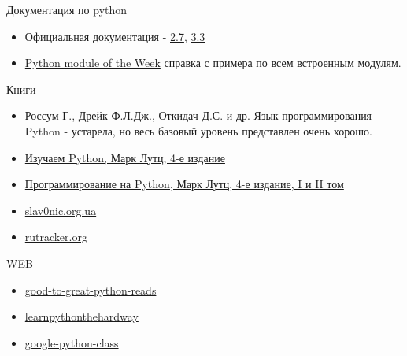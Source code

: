 \documentclass{article}
\begin{document}
\LARGE

\begin{center} Документация по python \end{center}
\begin{itemize}
	\item Официальная документация - \href{http://docs.python.org/2.7/}{2.7}, 
			\href{http://docs.python.org/3.3/}{3.3}
	\item \href{http://www.doughellmann.com/PyMOTW/}{Python module of the Week} 
		  справка с примера по всем встроенным модулям.
\end{itemize}

\begin{center} Книги \end{center}
\begin{itemize}
	\item Россум Г., Дрейк Ф.Л.Дж., Откидач Д.С. и др. Язык программирования Python 
	    - устарела, но весь базовый уровень представлен очень хорошо.
	\item \href{http://rutracker.org/forum/viewtopic.php?t=4130425}{Изучаем Python, Марк Лутц, 4-е издание}
	\item \href{http://rutracker.org/forum/viewtopic.php?t=3958297}{Программирование на Python, Марк Лутц, 4-е издание, I и II том}
    \item \href{http://slav0nic.org.ua/static/books/python/}{slav0nic.org.ua}
    \item \href{http://rutracker.org/forum/viewtopic.php?t=2436308}{rutracker.org}
\end{itemize}

\begin{center} WEB \end{center}
\begin{itemize} 
	\item \href{http://jessenoller.com/good-to-great-python-reads/}{good-to-great-python-reads}
	\item \href{http://learnpythonthehardway.org/}{learnpythonthehardway}
	\item \href{http://code.google.com/edu/languages/google-python-class/}{google-python-class}
\end{itemize}
\end{document}

